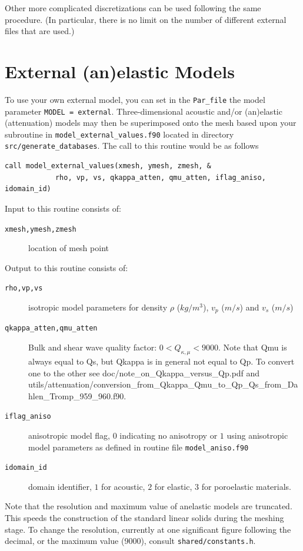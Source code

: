 Other more complicated discretizations can be used following the same procedure. (In particular, there is no limit on the number of different external files that are used.)



\section{External (an)elastic Models}\label{sec:Anelastic-Models}

To use your own external model, you can set in the \texttt{Par\_file}
the model parameter \texttt{MODEL = external}. Three-dimensional acoustic
and/or (an)elastic (attenuation) models may then be superimposed onto
the mesh based upon your subroutine in \texttt{model\_external\_values.f90}
located in directory \texttt{src/generate\_databases}. The call to
this routine would be as follows
\begin{verbatim}
call model_external_values(xmesh, ymesh, zmesh, &
            rho, vp, vs, qkappa_atten, qmu_atten, iflag_aniso, idomain_id)
\end{verbatim}
Input to this routine consists of:
\begin{description}
\item [{\texttt{xmesh,ymesh,zmesh}}] location of mesh point
\end{description}
Output to this routine consists of:
\begin{description}
\item [{\texttt{rho,vp,vs}}] isotropic model parameters for density $\rho$
($kg/m^{3}$), $v_{p}$ ($m/s$) and $v_{s}$ ($m/s$)
\item [{\texttt{qkappa\_atten,qmu\_atten}}] Bulk and shear wave quality factor: $0<Q_{\kappa,\mu}<9000$.
Note that Qmu is always equal to Qs, but Qkappa is in general not equal to Qp. To convert one to the other see doc/note\_on\_Qkappa\_versus\_Qp.pdf and utils/attenuation/conversion\_from\_Qkappa\_Qmu\_to\_Qp\_Qs\_from\_Dahlen\_Tromp\_959\_960.f90.
\item [{\texttt{iflag\_aniso}}] anisotropic model flag, $0$ indicating
no anisotropy or $1$ using anisotropic model parameters as defined
in routine file \texttt{model\_aniso.f90}
\item [{\texttt{idomain\_id}}] domain identifier, $1$ for acoustic, $2$
for elastic, $3$ for poroelastic materials.
\end{description}
Note that the resolution and maximum value of anelastic models are
truncated. This speeds the construction of the standard linear solids
during the meshing stage. To change the resolution, currently at one
significant figure following the decimal, or the maximum value (9000),
consult \texttt{shared/constants.h}.



